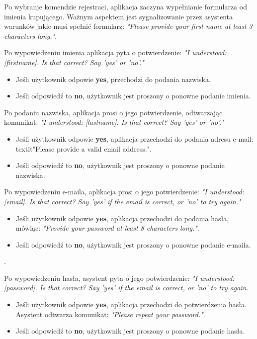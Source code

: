 Po wybranje komendzie rejestraci, aplikacja zaczyna wypełnianie formularza od imienia kupującego. Ważnym aspektem jest sygnalizowanie przez asystenta warunków jakie musi spełnić formularz: \textit{"Please provide your first name at least 3 characters long."}. 

Po wypowiedzeniu imienia aplikacja pyta o potwierdzenie:
\textit{"I understood: [firstname]. Is that correct? Say 'yes' or 'no'."}

\begin{itemize}
    \item Jeśli użytkownik odpowie \textbf{yes}, przechodzi do podania nazwiska.
    \item Jeśli odpowiedź to \textbf{no}, użytkownik jest proszony o ponowne podanie imienia.
\end{itemize}

Po podaniu nazwiska, aplikacja prosi o jego potwierdzenie, odtwarzając komunikat:
\textit{"I understood: [lastname]. Is that correct? Say 'yes' or 'no'."}

\begin{itemize}
    \item Jeśli użytkownik odpowie \textbf{yes}, aplikacja przechodzi do podania adresu e-mail: textit{"Please provide a valid email address."}.
    \item Jeśli odpowiedź to \textbf{no}, użytkownik jest proszony o ponowne podanie nazwiska.
\end{itemize}

Po wypowiedzeniu e-maila, aplikacja prosi o jego potwierdzenie:
\textit{"I understood: [email]. Is that correct? Say 'yes' if the email is correct, or 'no' to try again."}

\begin{itemize}
    \item Jeśli użytkownik odpowie \textbf{yes}, aplikacja przechodzi do podania hasła, mówiąc: \textit{"Provide your password at least 8 characters long."}.
    \item Jeśli odpowiedź to \textbf{no}, użytkownik jest proszony o ponowne podanie e-maila.
\end{itemize}.

Po wypowiedzeniu hasła, asystent pyta o jego potwierdzenie:
\textit{"I understood: [password]. Is that correct? Say 'yes' if the email is correct, or 'no' to try again.}
\begin{itemize}
    \item Jeśli użytkownik odpowie \textbf{yes}, aplikacja przechodzi do potwierdzenia hasła. Asystent odtwarza komunikat: \textit{"Please repeat your password."}.
    \item Jeśli odpowiedź to \textbf{no}, użytkownik jest proszony o ponowne podanie hasła.
\end{itemize}


